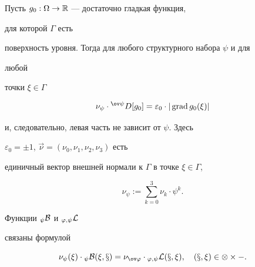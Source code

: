 \begin{lem} Пусть $g_0:\Omega\to\Bbb R$ --- достаточно гладкая функция, 


для которой $\Gamma$ есть 


поверхность уровня. Тогда для любого структурного набора $\psi$ и для 


любой 


точки $\xi\in\Gamma$ 


$$ 


\nu_\psi\cdot{}^{\ov\psi}D[g_0]=\varepsilon_0\cdot|\grad g_0 


(\xi)| 


$$ 


и, следовательно, левая часть не зависит от $\psi$. Здесь 


$\varepsilon_0=\pm 1$, $\Vec\nu=(\nu_0,\nu_1,\nu_2,\nu_3)$ есть 


единичный вектор внешней нормали к $\Gamma$ в точке $\xi\in\Gamma$, 


$$ 


\nu_\psi:=\sum^3_{k=0}\nu_k\cdot\psi^k. 


$$ 


\end{lem} 


 


\begin{cor} Функции ${}_\psi\cal B$ и ${}_{\varphi,\psi}\cal L$ 


связаны формулой 


$$


\nu_\psi(\xi)\cdot{}_\psi\cal B(\xi,x)=\nu_{\ov\varphi}\cdot 


{}_{\varphi,\psi}\cal L(x,\xi),\quad


(x,\xi)\in\Omega\times\Gamma. 


$$


\end{cor} 


 



